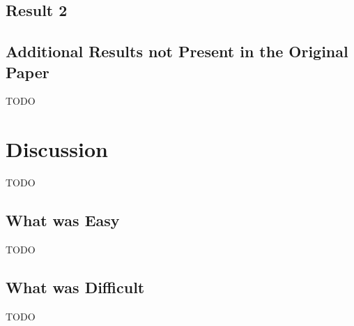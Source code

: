 \documentclass{article}
\begin{document}
\subsection{Result 2}

\subsection{Additional Results not Present in the Original Paper}
TODO

\section{Discussion}
TODO

\subsection{What was Easy}
TODO

\subsection{What was Difficult}
TODO
\end{document}
